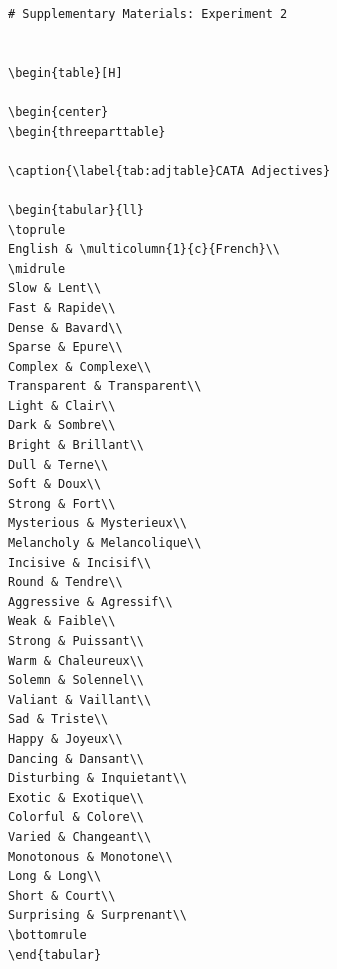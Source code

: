\documentclass[
]{article}
\begin{document}
\begin{verbatim}
# Supplementary Materials: Experiment 2


\begin{table}[H]

\begin{center}
\begin{threeparttable}

\caption{\label{tab:adjtable}CATA Adjectives}

\begin{tabular}{ll}
\toprule
English & \multicolumn{1}{c}{French}\\
\midrule
Slow & Lent\\
Fast & Rapide\\
Dense & Bavard\\
Sparse & Epure\\
Complex & Complexe\\
Transparent & Transparent\\
Light & Clair\\
Dark & Sombre\\
Bright & Brillant\\
Dull & Terne\\
Soft & Doux\\
Strong & Fort\\
Mysterious & Mysterieux\\
Melancholy & Melancolique\\
Incisive & Incisif\\
Round & Tendre\\
Aggressive & Agressif\\
Weak & Faible\\
Strong & Puissant\\
Warm & Chaleureux\\
Solemn & Solennel\\
Valiant & Vaillant\\
Sad & Triste\\
Happy & Joyeux\\
Dancing & Dansant\\
Disturbing & Inquietant\\
Exotic & Exotique\\
Colorful & Colore\\
Varied & Changeant\\
Monotonous & Monotone\\
Long & Long\\
Short & Court\\
Surprising & Surprenant\\
\bottomrule
\end{tabular}


\end{verbatim}
\end{document}
